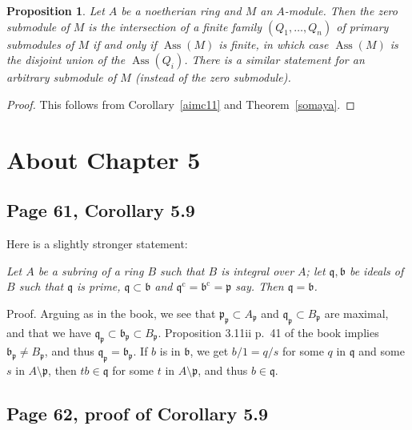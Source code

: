 \documentclass[parskip=half,fontsize=12pt]{scrartcl}%
\newcommand{\oo}{\operatorname}\newcommand{\ooo}{\operatorname*}
\newcommand{\mf}{\mathfrak}
\newcommand{\ppp}{\mf p}
\newcommand{\Ass}{\oo{Ass}}
\newtheorem{prop}[thm]{Proposition}
\begin{document}
\begin{prop}%
Let $A$ be a noetherian ring and $M$ an $A$-module. Then the zero submodule of $M$ is the intersection of a finite family $(Q_1,\dots,Q_n)$ of primary submodules  of $M$ if and only if $\Ass(M)$ is finite, in which case $\Ass(M)$ is the disjoint union of the $\Ass(Q_i)$. There is a similar statement for an arbitrary submodule of $M$ (instead of the zero submodule).%
\end{prop}
\begin{proof}
This follows from Corollary~\ref{aimc11} and Theorem~\ref{somaya}.
\end{proof}

\section{About Chapter 5}%

\subsection{Page 61, Corollary 5.9}\label{59}%

Here is a slightly stronger statement: 

\emph{Let $A$ be a subring of a ring $B$ such that $B$ is integral over $A$; let $\mf q,\mf b$ be ideals of $B$ such that $\mf q$ is prime, $\mf q\subset\mf b$ and $\mf q^{\oo c}=\mf b^{\oo c}=\ppp$ say. Then $\mf q=\mf b$.}

Proof. Arguing as in the book, we see that $\ppp_\ppp\subset A_\ppp$ and $\mf q_\ppp\subset B_\ppp$ are maximal, and that we have $\mf q_\ppp\subset\mf b_\ppp\subset B_\ppp$. Proposition 3.11ii p.~41 of the book implies $\mf b_\ppp\ne B_\ppp$, and thus $\mf q_\ppp=\mf b_\ppp$. If $b$ is in $\mf b$, we get $b/1=q/s$ for some $q$ in $\mf q$ and some $s$ in $A\setminus\ppp$, then $tb\in\mf q$ for some $t$ in $A\setminus\ppp$, and thus $b\in\mf q$.

\subsection{Page 62, proof of Corollary 5.9}%
\end{document}
